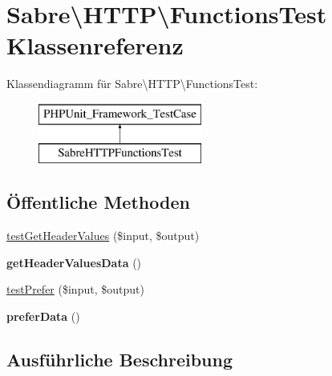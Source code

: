 \hypertarget{class_sabre_1_1_h_t_t_p_1_1_functions_test}{}\section{Sabre\textbackslash{}H\+T\+TP\textbackslash{}Functions\+Test Klassenreferenz}
\label{class_sabre_1_1_h_t_t_p_1_1_functions_test}
Klassendiagramm für Sabre\textbackslash{}H\+T\+TP\textbackslash{}Functions\+Test\+:\begin{figure}[H]
\begin{center}
\leavevmode
\includegraphics[height=2.000000cm]{class_sabre_1_1_h_t_t_p_1_1_functions_test}
\end{center}
\end{figure}
\subsection*{Öffentliche Methoden}
\begin{DoxyCompactItemize}
\item 
\mbox{\hyperlink{class_sabre_1_1_h_t_t_p_1_1_functions_test_ae011c7d670d306031127db8676de4675}{test\+Get\+Header\+Values}} (\$input, \$output)
\item 
\mbox{\label{class_sabre_1_1_h_t_t_p_1_1_functions_test_a9f5dc53fd6a92ce98377b84aa7713612}} 
{\bfseries get\+Header\+Values\+Data} ()
\item 
\mbox{\hyperlink{class_sabre_1_1_h_t_t_p_1_1_functions_test_a5436c7c7842dec208b0b48617cbb7bfc}{test\+Prefer}} (\$input, \$output)
\item 
\mbox{\label{class_sabre_1_1_h_t_t_p_1_1_functions_test_a7190a53e36a23e5a4342e5901e5e3004}} 
{\bfseries prefer\+Data} ()
\end{DoxyCompactItemize}


\subsection{Ausführliche Beschreibung}


